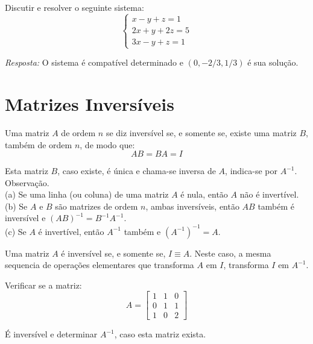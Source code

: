 \begin{ex}
	Discutir e resolver o seguinte sistema:\\
	\begin{equation*}
	\begin{cases}
		x-y+z=1 \\
		2x+y+2z=5\\
		3x-y+z=1
	\end{cases}
	\end{equation*}
\end{ex}
\textit{Resposta:} O sistema é compatível determinado e $(0,-2/3,1/3)$ é sua solução.
\newpage
\section{Matrizes Inversíveis}

\begin{df}
	Uma matriz $A$ de ordem $n$ se diz inversível se, e somente se, existe uma matriz $B$, também de ordem $n$, de modo que:\\
	\begin{equation*}
	AB=BA=I
	\end{equation*}
\end{df}
Esta matriz $B$, caso existe, é única e chama-se inversa de $A$, indica-se por $A^{-1}$.\\

Observação. \\
(a) Se uma linha (ou coluna) de uma matriz $A$ é nula, então $A$ não é invertível. \\
(b) Se $A$ e $B$ são matrizes de ordem $n$, ambas inversíveis, então $AB$ também é inversível e $(AB)^{-1}=B^{-1}A^{-1}$.\\
(c) Se $A$ é invertível, então $A^{-1}$ também e $(A^{-1})^{-1}=A$.

\begin{teo}
	Uma matriz $A$ é inversível se, e somente se, $I\equiv A$. Neste caso, a mesma sequencia de operações elementares que transforma $A$ em $I$, transforma $I$ em $A^{-1}$.
\end{teo}
\begin{ex}
	Verificar se a matriz:\\
	\begin{equation*}
	A=\begin{bmatrix}
	1   & 1 & 0 \\
	0   & 1 & 1 \\
	1   & 0 & 2
	\end{bmatrix}
	\end{equation*}
\end{ex}
É inversível e determinar $A^{-1}$, caso esta matriz exista.
